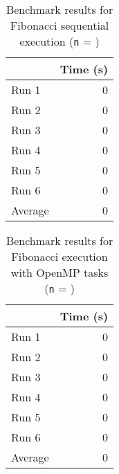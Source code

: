 \documentclass[12pt]{article}
\begin{document}
\begin{table}[H]
  \centering
  \begin{tabular}{lr}
    & {\bf Time (s)} \\
    \hline
    Run 1 & 0 \\
    Run 2 & 0 \\
    Run 3 & 0 \\
    Run 4 & 0 \\
    Run 5 & 0 \\
    Run 6 & 0 \\
    \hline
    Average & 0 \\
  \end{tabular}
  \caption{Benchmark results for Fibonacci sequential execution ({\tt n} = \fibNumber{})}
  \label{tbl-fib-sequential}
\end{table}

\begin{table}[H]
  \centering
  \begin{tabular}{lr}
    & {\bf Time (s)} \\
    \hline
    Run 1 & 0 \\
    Run 2 & 0 \\
    Run 3 & 0 \\
    Run 4 & 0 \\
    Run 5 & 0 \\
    Run 6 & 0 \\
    \hline
    Average & 0 \\
  \end{tabular}
  \caption{Benchmark results for Fibonacci execution with OpenMP tasks ({\tt n} = \fibNumber{})}
  \label{tbl-fib-tasks}
\end{table}

\end{document}
